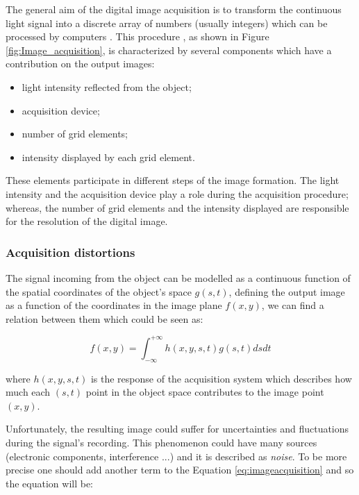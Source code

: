 \documentclass[../main.tex]{subfiles}
\begin{document}
The general aim of the digital image acquisition is to transform the continuous light signal into a discrete array of numbers (usually integers) which can be processed by computers \cite{image_acquisition_article}. This procedure , as shown in Figure \ref{fig:Image_acquisition}, is characterized by several components which have a contribution on the output images:

\begin{itemize}
    \item light intensity reflected from the object;
    \item acquisition device;
    \item number of grid elements;
    \item intensity displayed by each grid element.
\end{itemize}

These elements participate in different steps of the image formation. The light intensity and the acquisition device play a role during the acquisition procedure; whereas, the number of grid elements and the intensity displayed are responsible for the resolution of the digital image.

\subsubsection{Acquisition distortions}

The signal incoming from the object can be modelled as a continuous function of the spatial coordinates of the object's space $g(s,t)$, defining the output image as a function of the coordinates in the image plane $f(x,y)$, we can find a relation between them which could be seen as:

\begin{equation} \label{eq:imageacquisition}
    f(x,y) = \int_{-\infty}^{+\infty} h(x,y,s,t)g(s,t) dsdt
\end{equation}

where $h(x,y,s,t)$ is the response of the acquisition system which describes how much each $(s,t)$ point in the object space contributes to the image point $(x,y)$.

Unfortunately, the resulting image could suffer for uncertainties and fluctuations during the signal's recording. This phenomenon could have many sources (electronic components, interference ...) and it is described as \textit{noise}.
To be more precise one should add another term to the Equation \ref{eq:imageacquisition} and so the equation will be:
\end{document}
